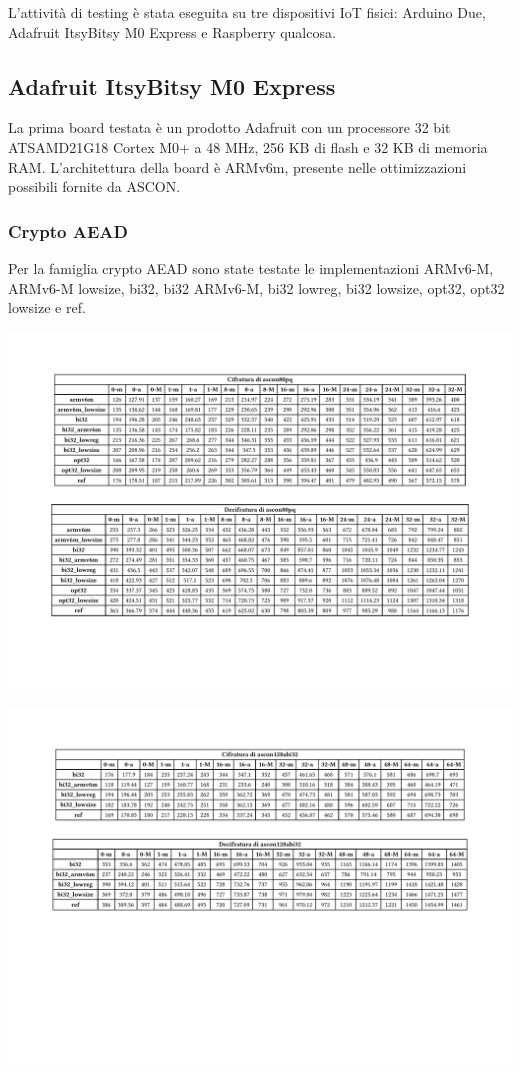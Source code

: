 \documentclass{report}
\begin{document}
L'attività di testing è stata eseguita su tre dispositivi IoT fisici: Arduino Due, Adafruit ItsyBitsy M0 Express e Raspberry qualcosa.

\subsection{Adafruit ItsyBitsy M0 Express}

La prima board testata è un prodotto Adafruit con un processore 32 bit ATSAMD21G18 Cortex M0+ a 48 MHz, 256 KB di flash e 32 KB di memoria RAM.\cite{adafruit} L'architettura della board è ARMv6m, presente nelle ottimizzazioni possibili fornite da ASCON.\cite{arm}

\subsubsection{Crypto AEAD}

Per la famiglia crypto AEAD sono state testate le implementazioni ARMv6-M, ARMv6-M lowsize, bi32, bi32 ARMv6-M, bi32 lowreg, bi32 lowsize, opt32, opt32 lowsize e ref.

\includegraphics[width=\textwidth]{adafruit/ascon80pq.pdf}

\includegraphics[width=\textwidth]{adafruit/ascon128abi32.pdf}
\end{document}
